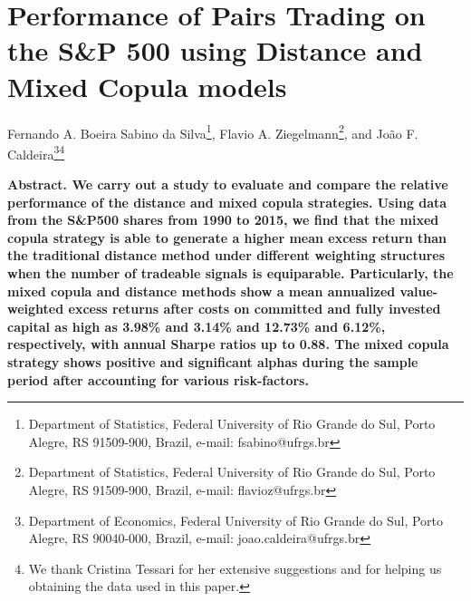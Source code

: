 \documentclass[a4paper,12pt]{report}
\begin{document}
	\chapter{Performance of Pairs Trading on the S\&P 500 using Distance and Mixed Copula models}{} %
	\thispagestyle{myheadings}
	\markright{}
	
	
	
	\begin{center}\sc Fernando A. Boeira Sabino da Silva\footnote{Department of Statistics, Federal University of Rio Grande do Sul, Porto Alegre, RS 91509-900, Brazil, e-mail: fsabino@ufrgs.br}, Flavio A. Ziegelmann\footnote{Department of Statistics, Federal University of Rio Grande do Sul, Porto Alegre, RS 91509-900, Brazil, e-mail: flavioz@ufrgs.br}, and João F. Caldeira\footnote{Department of Economics, Federal University of Rio Grande do Sul, Porto Alegre, RS 90040-000, Brazil, e-mail: joao.caldeira@ufrgs.br}\footnote{We thank Cristina Tessari for her extensive suggestions and for helping us obtaining the data used in this paper.}\end{center}
	
	
	\setlength{\baselineskip}{12pt}
	\noindent\bf Abstract. \rm We carry out a study to evaluate and compare the relative performance of the distance and mixed copula strategies. Using data from the S\&P500 shares from 1990 to 2015, we find that the mixed copula strategy is able to generate a higher mean excess return than the traditional distance method under different weighting structures when the number of tradeable signals is equiparable. Particularly, the mixed copula and distance methods show a mean annualized value-weighted excess returns after costs on committed and fully invested capital as high as 3.98\% and 3.14\% and 12.73\% and 6.12\%, respectively, with annual Sharpe ratios up to 0.88. The mixed copula strategy shows positive and significant alphas during the sample period after accounting for various risk-factors.\\[.1in]
	
\end{document}
